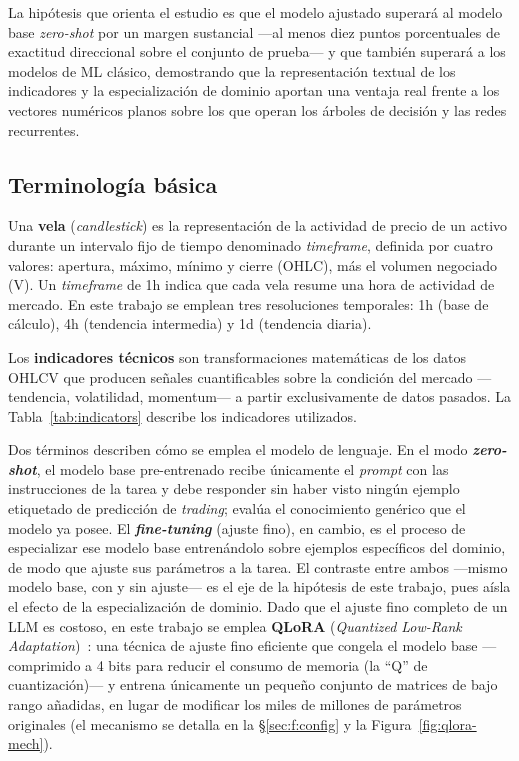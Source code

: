 \documentclass[10pt,twocolumn]{article}
\begin{document}
La hip\'otesis que orienta el estudio es que el modelo ajustado superar\'a al modelo base \textit{zero-shot} por un margen sustancial ---al menos diez puntos porcentuales de exactitud direccional sobre el conjunto de prueba--- y que tambi\'en superar\'a a los modelos de ML cl\'asico, demostrando que la representaci\'on textual de los indicadores y la especializaci\'on de dominio aportan una ventaja real frente a los vectores num\'ericos planos sobre los que operan los \'arboles de decisi\'on y las redes recurrentes.

\subsection{Terminolog\'ia b\'asica}

Una \textbf{vela} (\textit{candlestick}) es la representaci\'on de la actividad de precio de un activo durante un intervalo fijo de tiempo denominado \textit{timeframe}, definida por cuatro valores: apertura, m\'aximo, m\'inimo y cierre (OHLC), m\'as el volumen negociado (V). Un \textit{timeframe} de 1h indica que cada vela resume una hora de actividad de mercado. En este trabajo se emplean tres resoluciones temporales: 1h (base de c\'alculo), 4h (tendencia intermedia) y 1d (tendencia diaria).

Los \textbf{indicadores t\'ecnicos} son transformaciones matem\'aticas de los datos OHLCV que producen se\~nales cuantificables sobre la condici\'on del mercado ---tendencia, volatilidad, momentum--- a partir exclusivamente de datos pasados. La Tabla~\ref{tab:indicators} describe los indicadores utilizados.

Dos t\'erminos describen c\'omo se emplea el modelo de lenguaje. En el modo \textit{\textbf{zero-shot}}, el modelo base pre-entrenado recibe \'unicamente el \textit{prompt} con las instrucciones de la tarea y debe responder sin haber visto ning\'un ejemplo etiquetado de predicci\'on de \textit{trading}; eval\'ua el conocimiento gen\'erico que el modelo ya posee. El \textit{\textbf{fine-tuning}} (ajuste fino), en cambio, es el proceso de especializar ese modelo base entren\'andolo sobre ejemplos espec\'ificos del dominio, de modo que ajuste sus par\'ametros a la tarea. El contraste entre ambos ---mismo modelo base, con y sin ajuste--- es el eje de la hip\'otesis de este trabajo, pues a\'isla el efecto de la especializaci\'on de dominio. Dado que el ajuste fino completo de un LLM es costoso, en este trabajo se emplea \textbf{QLoRA} (\textit{Quantized Low-Rank Adaptation})~\cite{dettmers2023}: una t\'ecnica de ajuste fino eficiente que congela el modelo base ---comprimido a 4 bits para reducir el consumo de memoria (la ``Q'' de cuantizaci\'on)--- y entrena \'unicamente un peque\~no conjunto de matrices de bajo rango a\~nadidas, en lugar de modificar los miles de millones de par\'ametros originales (el mecanismo se detalla en la \S\ref{sec:f:config} y la Figura~\ref{fig:qlora-mech}).
\end{document}

